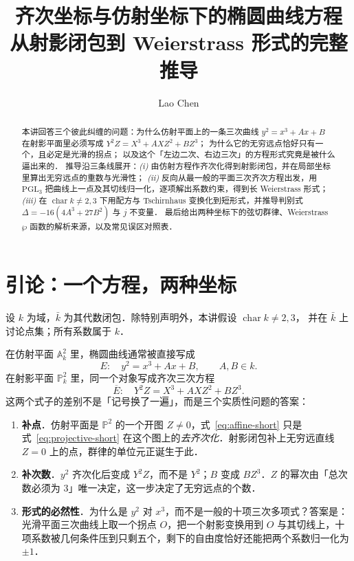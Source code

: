 \documentclass[10pt,a4paper]{article}
\numberwithin{equation}{section}
\begin{document}
\title{\textbf{齐次坐标与仿射坐标下的椭圆曲线方程}\\ \large 从射影闭包到 Weierstrass 形式的完整推导}
\author{Lao Chen}
\maketitle
\setcounter{tocdepth}{2}
\tableofcontents

\begin{abstract}
本讲回答三个彼此纠缠的问题：为什么仿射平面上的一条三次曲线
$y^{2}=x^{3}+Ax+B$ 在射影平面里必须写成 $Y^{2}Z=X^{3}+AXZ^{2}+BZ^{3}$；
为什么它的无穷远点恰好只有一个，且必定是光滑的拐点；
以及这个「左边二次、右边三次」的方程形式究竟是被什么逼出来的．
推导沿三条线展开：\emph{(i)} 由仿射方程作齐次化得到射影闭包，并在局部坐标里算出无穷远点的重数与光滑性；
\emph{(ii)} 反向从最一般的平面三次齐次方程出发，用 $\mathrm{PGL}_{3}$ 把曲线上一点及其切线归一化，逐项解出系数约束，得到长 Weierstrass 形式；
\emph{(iii)} 在 $\operatorname{char}k\neq 2,3$ 下用配方与 Tschirnhaus 变换化到短形式，并推导判别式 $\Delta=-16(4A^{3}+27B^{2})$ 与 $j$ 不变量．
最后给出两种坐标下的弦切群律、Weierstrass $\wp$ 函数的解析来源，以及常见误区对照表．
\end{abstract}

\section{引论：一个方程，两种坐标}

设 $k$ 为域，$\bar k$ 为其代数闭包．除特别声明外，本讲假设 $\operatorname{char}k\neq 2,3$，
并在 $\bar k$ 上讨论点集；所有系数属于 $k$．

在仿射平面 $\mathbb A^{2}_{k}$ 里，椭圆曲线通常被直接写成
\begin{equation}\label{eq:affine-short}
E:\quad y^{2}=x^{3}+Ax+B,\qquad A,B\in k .
\end{equation}
在射影平面 $\mathbb P^{2}_{k}$ 里，同一个对象写成齐次三次方程
\begin{equation}\label{eq:projective-short}
\overline E:\quad Y^{2}Z=X^{3}+AXZ^{2}+BZ^{3}.
\end{equation}
这两个式子的差别不是「记号换了一遍」，而是三个实质性问题的答案：

\begin{enumerate}
\item \textbf{补点}．仿射平面是 $\mathbb P^{2}$ 的一个开图 $Z\neq 0$，式~\eqref{eq:affine-short} 只是式~\eqref{eq:projective-short} 在这个图上的\emph{去齐次化}．射影闭包补上无穷远直线 $Z=0$ 上的点，群律的单位元正诞生于此．
\item \textbf{补次数}．$y^{2}$ 齐次化后变成 $Y^{2}Z$，而不是 $Y^{2}$；$B$ 变成 $BZ^{3}$．$Z$ 的幂次由「总次数必须为 $3$」唯一决定，这一步决定了无穷远点的个数．
\item \textbf{形式的必然性}．为什么是 $y^{2}$ 对 $x^{3}$，而不是一般的十项三次多项式？答案是：光滑平面三次曲线上取一个拐点 $O$，把一个射影变换用到 $O$ 与其切线上，十项系数被几何条件压到只剩五个，剩下的自由度恰好还能把两个系数归一化为 $\pm1$．
\end{enumerate}
\end{document}
